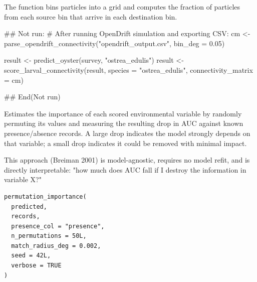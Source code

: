 \documentclass[a4paper]{book}
\begin{document}
\begin{Arguments}
\begin{itemize}
\end{itemize}


The function bins particles into a grid and computes the fraction of particles
from each source bin that arrive in each destination bin.


## Not run: 
\# After running OpenDrift simulation and exporting CSV:
cm <- parse\_opendrift\_connectivity("opendrift\_output.csv", bin\_deg = 0.05)

result <- predict\_oyster(survey, "ostrea\_edulis")
result <- score\_larval\_connectivity(result,
            species             = "ostrea\_edulis",
            connectivity\_matrix = cm)

## End(Not run)

\end{Arguments}
%
\begin{Description}
Estimates the importance of each scored environmental variable by randomly
permuting its values and measuring the resulting drop in AUC against known
presence/absence records. A large drop indicates the model strongly depends
on that variable; a small drop indicates it could be removed with minimal
impact.

This approach (Breiman 2001) is model-agnostic, requires no model refit,
and is directly interpretable: "how much does AUC fall if I destroy the
information in variable X?"
\end{Description}
%
\begin{Usage}
\begin{verbatim}
permutation_importance(
  predicted,
  records,
  presence_col = "presence",
  n_permutations = 50L,
  match_radius_deg = 0.002,
  seed = 42L,
  verbose = TRUE
)
\end{verbatim}
\end{Usage}
%
\end{document}
